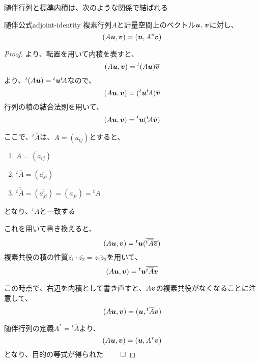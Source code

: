 \documentclass[../../../topic_linear-algebra]{subfiles}
\begin{document}
随伴行列と\hyperref[def:standard-inner-product-Cn]{標準内積}は、次のような関係で結ばれる

\begin{theorem}{随伴公式}{adjoint-identity}
  複素行列$A$と計量空間上のベクトル$\vb*{u},\,\vb*{v}$に対し、
  \begin{equation*}
    (A\vb*{u}, \vb*{v}) = (\vb*{u}, A^*\vb*{v})
  \end{equation*}
\end{theorem}

\begin{proof}
  より、転置を用いて内積を表すと、
  \begin{equation*}
    (A\vb*{u},\vb*{v}) = {}^t(A\vb*{u}) \overline{\vb*{v}}
  \end{equation*}
  より、${}^t(A\vb*{u}) = {}^t\vb*{u} {}^t\! A$なので、
  \begin{equation*}
    (A\vb*{u},\vb*{v}) = ({}^t\vb*{u} {}^t\! A) \overline{\vb*{v}}
  \end{equation*}
  行列の積の結合法則を用いて、
  \begin{equation*}
    (A\vb*{u},\vb*{v}) = {}^t\vb*{u} ({}^t\! A\overline{\vb*{v}})
  \end{equation*}

  ここで、$\overline{{}^t \overline{A}}$は、$A=(a_{ij})$とすると、
  \begin{enumerate}
    \item $\overline{A} = (\overline{a_{ij}})$
    \item ${}^t\overline{A} = (\overline{a_{ji}})$
    \item $\overline{{}^t\overline{A}} = (\overline{\overline{a_{ji}}}) = (a_{ji}) = {}^t A$
  \end{enumerate}
  となり、${}^t A$と一致する

  これを用いて書き換えると、
  \begin{equation*}
    (A\vb*{u},\vb*{v}) = {}^t\vb*{u} (\overline{{}^t \overline{A}} \overline{\vb*{v}})
  \end{equation*}
  複素共役の積の性質$\overline{z_1} \cdot \overline{z_2} = \overline{z_1 z_2}$を用いて、
  \begin{equation*}
    (A\vb*{u},\vb*{v}) = {}^t\vb*{u} \overline{{}^t \overline{A} \vb*{v}}
  \end{equation*}

  この時点で、右辺を内積として書き直すと、$A\vb*{v}$の複素共役がなくなることに注意して、
  \begin{equation*}
    (A\vb*{u},\vb*{v}) = (\vb*{u}, {}^t \overline{A} \vb*{v})
  \end{equation*}

  随伴行列の定義$A^* = {}^t \overline{A}$より、
  \begin{equation*}
    (A\vb*{u},\vb*{v}) = (\vb*{u}, A^* \vb*{v})
  \end{equation*}
  となり、目的の等式が得られた $\qed$
\end{proof}
\end{document}

